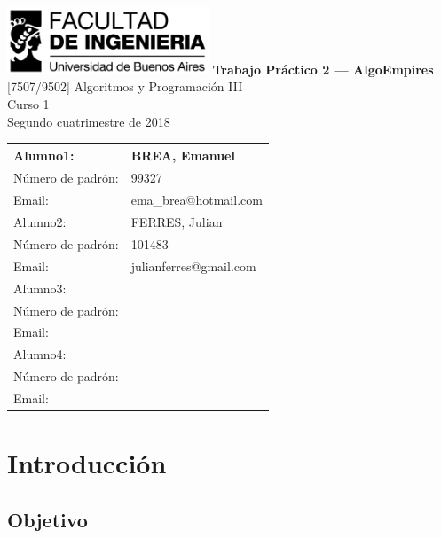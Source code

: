 \documentclass[titlepage,a4paper]{article}
\begin{document}
\begin{titlepage} %
	\hfill\includegraphics[width=6cm]{logofiuba.jpg}
    \centering
    \vfill
    \Huge \textbf{Trabajo Práctico 2 — AlgoEmpires}
    \vskip2cm
    \Large [7507/9502] Algoritmos y Programación III\\
    Curso 1 \\ %
    Segundo cuatrimestre de 2018 
    \vfill
    \begin{tabular}{ | l | l | } %
      \hline
	    Alumno1: & BREA, Emanuel \\ \hline
	    Número de padrón: & 99327 \\ \hline
	    Email: & ema\_brea@hotmail.com  \\ \hline
      
        \hline
        Alumno2: & FERRES, Julian \\ \hline
        Número de padrón: & 101483 \\ \hline
        Email: & julianferres@gmail.com \\ \hline
         
        \hline
        Alumno3: &  \\ \hline
        Número de padrón: & \\ \hline
        Email: &  \\ \hline
            
        \hline
        Alumno4: &  \\ \hline
        Número de padrón: &  \\ \hline
        Email: &  \\ \hline
  	\end{tabular}
    \vfill
    \vfill
\end{titlepage}

\tableofcontents %
\newpage

\section{Introducción}\label{sec:intro}

\subsection{Objetivo}
\end{document}
